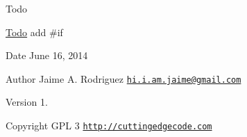 \begin{DoxyRefDesc}{Todo}
\item[\hyperlink{todo__todo000001}{Todo}]add \#if\end{DoxyRefDesc}


\begin{DoxyDate}{Date}
June 16, 2014 
\end{DoxyDate}
\begin{DoxyAuthor}{Author}
Jaime A. Rodriguez \href{mailto:hi.i.am.jaime@gmail.com}{\tt hi.\-i.\-am.\-jaime@gmail.\-com} 
\end{DoxyAuthor}
\begin{DoxyVersion}{Version}
1. 
\end{DoxyVersion}
\begin{DoxyCopyright}{Copyright}
G\-P\-L 3 \href{http://cuttingedgecode.com}{\tt http\-://cuttingedgecode.\-com} 
\end{DoxyCopyright}

